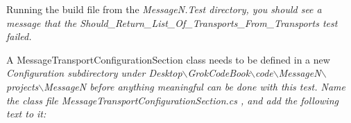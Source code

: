 

Running the build file from the \em MessageN.Test \em directory, you should see a message that the \em Should\_Return\_List\_Of\_Transports\_From\_Transports \em test failed.

A MessageTransportConfigurationSection class needs to be defined in a new \em Configuration \em subdirectory under \em Desktop$\backslash$GrokCodeBook$\backslash$code$\backslash$MessageN$\backslash$projects$\backslash$MessageN \em before anything meaningful can be done with this test. Name the class file \em MessageTransportConfigurationSection.cs \em, and add the following text to it:

